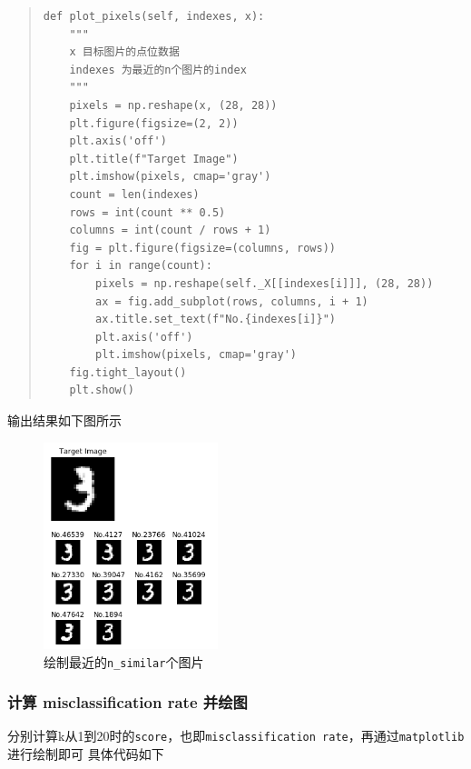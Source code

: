 \documentclass[UTF8]{ctexart}
\begin{document}
\begin{quote}
    \begin{lstlisting}[breaklines, title=\lstinline{plot_pixels}方法]
def plot_pixels(self, indexes, x):
    """
    x 目标图片的点位数据
    indexes 为最近的n个图片的index
    """
    pixels = np.reshape(x, (28, 28))
    plt.figure(figsize=(2, 2))
    plt.axis('off')
    plt.title(f"Target Image")
    plt.imshow(pixels, cmap='gray')
    count = len(indexes)
    rows = int(count ** 0.5)
    columns = int(count / rows + 1)
    fig = plt.figure(figsize=(columns, rows))
    for i in range(count):
        pixels = np.reshape(self._X[[indexes[i]]], (28, 28))
        ax = fig.add_subplot(rows, columns, i + 1)
        ax.title.set_text(f"No.{indexes[i]}")
        plt.axis('off')
        plt.imshow(pixels, cmap='gray')
    fig.tight_layout()
    plt.show()
    \end{lstlisting}
\end{quote}

输出结果如下图所示
\begin{figure}[h]
    \centering
    \includegraphics[width=2in]{asset/closest.png}
    \caption{绘制最近的\lstinline{n_similar}个图片} %
\end{figure}

\vspace*{10em}

\subsubsection{计算 misclassification rate 并绘图}
分别计算k从1到20时的\lstinline{score}，也即\lstinline{misclassification rate}，再通过\lstinline{matplotlib}进行绘制即可
具体代码如下
\end{document}
